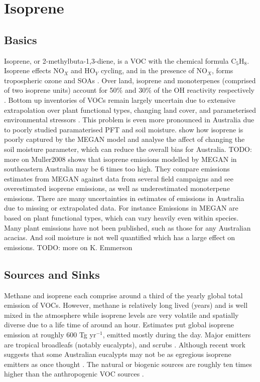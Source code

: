 \section{Isoprene}
\label{ch_LitRev:sec:isoprene}

  \subsection{Basics}
    Isoprene, or 2-methylbuta-1,3-diene, is a VOC with the chemical formula C$_5$H$_8$. 
    Isoprene effects NO$_X$ and HO$_Y$ cycling, and in the presence of NO$_X$, forms tropospheric ozone and SOAs \citep{Wagner2002, Millet2006}.
    Over land, isoprene and monoterpenes (comprised of two isoprene units) account for 50\% and 30\% of the OH reactivity respectively \citep{Fuentes2000}.
    Bottom up inventories of VOCs remain largely uncertain due to extensive extrapolation over plant functional types, changing land cover, and parameterised environmental stressors \citep{Guenther2000,Kanakidou2005}.
    This problem is even more pronounced in Australia due to poorly studied paramaterised PFT and soil moisture.
    \cite{Muller2008} show how isoprene is poorly captured by the MEGAN model and analyse the affect of changing the soil moisture parameter, which can reduce the overall bias for Australia.
    TODO: more on Muller2008
    \cite{Emmerson2016} shows that isoprene emissions modelled by MEGAN in southeastern Australia may be 6 times too high. 
    They compare emissions estimates from MEGAN against data from several field campaigns and see overestimated isoprene emissions, as well as underestimated monoterpene emissions.
    There are many uncertainties in estimates of emissions in Australia due to missing or extrapolated data.
    For instance Emissions in MEGAN are based on plant functional types, which can vary heavily even within species.
    Many plant emissions have not been published, such as those for any Australian acacias.
    And soil moisture is not well quantified which has a large effect on emissions.
    TODO: more on K. Emmerson

  \subsection{Sources and Sinks}
    Methane and isoprene each comprise around a third of the yearly global total emission of VOCs.
    However, methane is relatively long lived (years) and is well mixed in the atmosphere while isoprene levels are very volatile and spatially diverse due to a life time of around an hour.
    Estimates put global isoprene emission at roughly 600 Tg yr$^{-1}$, emitted mostly during the day.
    Major emitters are tropical broadleafs (notably eucalypts), and scrubs \citep{Guenther2006, Arneth2008, Niinemets2010, Monks2015}.
    Although recent work suggests that some Australian eucalypts may not be as egregious isoprene emitters as once thought \citet{Emmerson2016}.
    The natural or biogenic sources are roughly ten times higher than the anthropogenic VOC sources \citep{Guenther2006, Kanakidou2005}.

